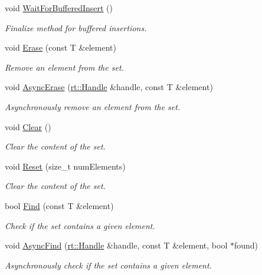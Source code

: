 \begin{DoxyCompactItemize}
void \hyperlink{classshad_1_1Set_a3712197c5aaeadf247975051f81b03c7}{Wait\-For\-Buffered\-Insert} ()
\begin{DoxyCompactList}\small\item\em Finalize method for buffered insertions. \end{DoxyCompactList}\item 
void \hyperlink{classshad_1_1Set_a1d7269e2f1468f877d1efaac95e780e1}{Erase} (const T \&element)
\begin{DoxyCompactList}\small\item\em Remove an element from the set. \end{DoxyCompactList}\item 
void \hyperlink{classshad_1_1Set_ad424d2a53863f1228f245d57d8439842}{Async\-Erase} (\hyperlink{classshad_1_1rt_1_1Handle}{rt\-::\-Handle} \&handle, const T \&element)
\begin{DoxyCompactList}\small\item\em Asynchronously remove an element from the set. \end{DoxyCompactList}\item 
void \hyperlink{classshad_1_1Set_ad12b4cacd980e45c5cf77997917c17c1}{Clear} ()
\begin{DoxyCompactList}\small\item\em Clear the content of the set. \end{DoxyCompactList}\item 
void \hyperlink{classshad_1_1Set_a1af0696f3c2e3aea11fc04aaf39c7740}{Reset} (size\-\_\-t num\-Elements)
\begin{DoxyCompactList}\small\item\em Clear the content of the set. \end{DoxyCompactList}\item 
bool \hyperlink{classshad_1_1Set_a0a43db8a4eb3d76b5150d63e53c2ab50}{Find} (const T \&element)
\begin{DoxyCompactList}\small\item\em Check if the set contains a given element. \end{DoxyCompactList}\item 
void \hyperlink{classshad_1_1Set_afd802c9be7b268deafdc2ca6322e2a53}{Async\-Find} (\hyperlink{classshad_1_1rt_1_1Handle}{rt\-::\-Handle} \&handle, const T \&element, bool $\ast$found)
\begin{DoxyCompactList}\small\item\em Asynchronously check if the set contains a given element. \end{DoxyCompactList}\item 

\end{DoxyCompactItemize}
